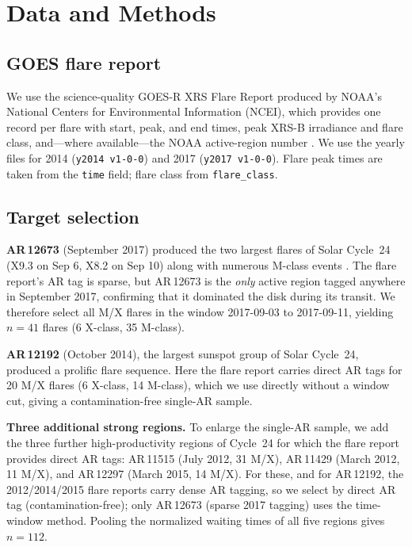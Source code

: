 \documentclass[12pt,a4paper]{article}
\begin{document}
\section{Data and Methods}

\subsection{GOES flare report}

We use the science-quality GOES-R XRS Flare Report produced by NOAA's National Centers for Environmental Information (NCEI), which provides one record per flare with start, peak, and end times, peak XRS-B irradiance and flare class, and---where available---the NOAA active-region number \citep{nceiflrpt}. We use the yearly files for 2014 (\texttt{y2014\,v1-0-0}) and 2017 (\texttt{y2017\,v1-0-0}). Flare peak times are taken from the \texttt{time} field; flare class from \texttt{flare\_class}.

\subsection{Target selection}

\textbf{AR\,12673} (September 2017) produced the two largest flares of Solar Cycle~24 (X9.3 on Sep 6, X8.2 on Sep 10) along with numerous M-class events \citep{yang2017}. The flare report's AR tag is sparse, but AR\,12673 is the \emph{only} active region tagged anywhere in September 2017, confirming that it dominated the disk during its transit. We therefore select all M/X flares in the window 2017-09-03 to 2017-09-11, yielding $n=41$ flares (6 X-class, 35 M-class).

\textbf{AR\,12192} (October 2014), the largest sunspot group of Solar Cycle~24, produced a prolific flare sequence. Here the flare report carries direct AR tags for 20 M/X flares (6 X-class, 14 M-class), which we use directly without a window cut, giving a contamination-free single-AR sample.

\textbf{Three additional strong regions.} To enlarge the single-AR sample, we add the three further high-productivity regions of Cycle~24 for which the flare report provides direct AR tags: AR\,11515 (July 2012, 31 M/X), AR\,11429 (March 2012, 11 M/X), and AR\,12297 (March 2015, 14 M/X). For these, and for AR\,12192, the 2012/2014/2015 flare reports carry dense AR tagging, so we select by direct AR tag (contamination-free); only AR\,12673 (sparse 2017 tagging) uses the time-window method. Pooling the normalized waiting times of all five regions gives $n=112$.
\end{document}
